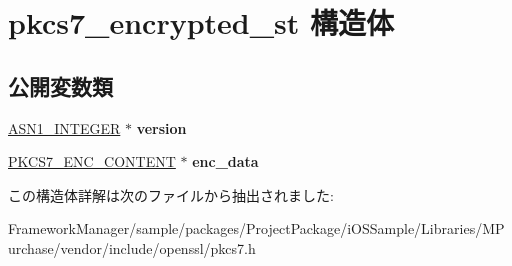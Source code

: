 \hypertarget{structpkcs7__encrypted__st}{}\section{pkcs7\+\_\+encrypted\+\_\+st 構造体}
\label{structpkcs7__encrypted__st}
\subsection*{公開変数類}
\begin{DoxyCompactItemize}
\item 
\hypertarget{structpkcs7__encrypted__st_a5c44f8bfad75a8a28e7690ca983f50ae}{}\hyperlink{structasn1__string__st}{A\+S\+N1\+\_\+\+I\+N\+T\+E\+G\+E\+R} $\ast$ {\bfseries version}\label{structpkcs7__encrypted__st_a5c44f8bfad75a8a28e7690ca983f50ae}

\item 
\hypertarget{structpkcs7__encrypted__st_ae9cf2da80ef23d3b5ae157898ff071a4}{}\hyperlink{structpkcs7__enc__content__st}{P\+K\+C\+S7\+\_\+\+E\+N\+C\+\_\+\+C\+O\+N\+T\+E\+N\+T} $\ast$ {\bfseries enc\+\_\+data}\label{structpkcs7__encrypted__st_ae9cf2da80ef23d3b5ae157898ff071a4}

\end{DoxyCompactItemize}


この構造体詳解は次のファイルから抽出されました\+:\begin{DoxyCompactItemize}
\item 
Framework\+Manager/sample/packages/\+Project\+Package/i\+O\+S\+Sample/\+Libraries/\+M\+Purchase/vendor/include/openssl/pkcs7.\+h\end{DoxyCompactItemize}
